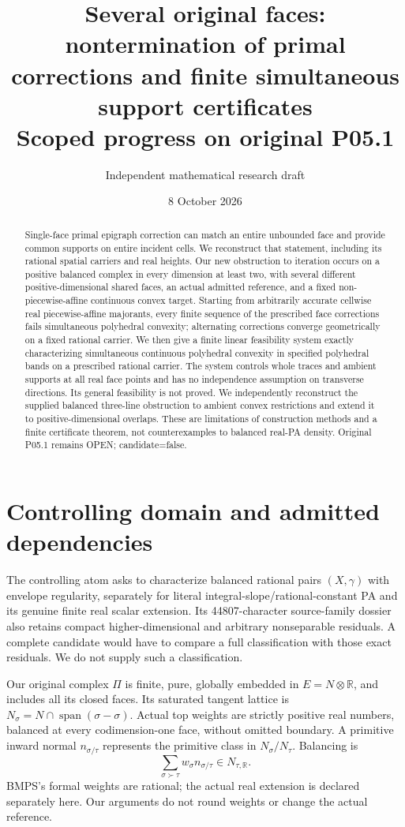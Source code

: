 \documentclass[11pt]{article}
\title{Several original faces: nontermination of primal corrections and finite simultaneous support certificates\\\large Scoped progress on original P05.1}
\author{Independent mathematical research draft}
\date{8 October 2026}
\newcommand{\R}{\mathbb R}
\begin{document}
\maketitle
\begin{abstract}
Single-face primal epigraph correction can match an entire unbounded face and provide common supports on entire incident cells. We reconstruct that statement, including its rational spatial carriers and real heights. Our new obstruction to iteration occurs on a positive balanced complex in every dimension at least two, with several different positive-dimensional shared faces, an actual admitted reference, and a fixed non-piecewise-affine continuous convex target. Starting from arbitrarily accurate cellwise real piecewise-affine majorants, every finite sequence of the prescribed face corrections fails simultaneous polyhedral convexity; alternating corrections converge geometrically on a fixed rational carrier. We then give a finite linear feasibility system exactly characterizing simultaneous continuous polyhedral convexity in specified polyhedral bands on a prescribed rational carrier. The system controls whole traces and ambient supports at all real face points and has no independence assumption on transverse directions. Its general feasibility is not proved. We independently reconstruct the supplied balanced three-line obstruction to ambient convex restrictions and extend it to positive-dimensional overlaps. These are limitations of construction methods and a finite certificate theorem, not counterexamples to balanced real-PA density. Original P05.1 remains OPEN; candidate=false.
\end{abstract}
\tableofcontents

\section{Controlling domain and admitted dependencies}
The controlling atom asks to characterize balanced rational pairs $(X,\gamma)$ with envelope regularity, separately for literal integral-slope/rational-constant PA and its genuine finite real scalar extension. Its 44807-character source-family dossier also retains compact higher-dimensional and arbitrary nonseparable residuals. A complete candidate would have to compare a full classification with those exact residuals. We do not supply such a classification.

Our original complex $\Pi$ is finite, pure, globally embedded in $E=N\otimes\R$, and includes all its closed faces. Its saturated tangent lattice is $N_\sigma=N\cap\operatorname{span}(\sigma-\sigma)$. Actual top weights are strictly positive real numbers, balanced at every codimension-one face, without omitted boundary. A primitive inward normal $n_{\sigma/\tau}$ represents the primitive class in $N_\sigma/N_\tau$. Balancing is
\[
 \sum_{\sigma\succ\tau}w_\sigma n_{\sigma/\tau}\in N_{\tau,\R}.
\]
BMPS's formal weights are rational; the actual real extension is declared separately here. Our arguments do not round weights or change the actual reference.
\end{document}
